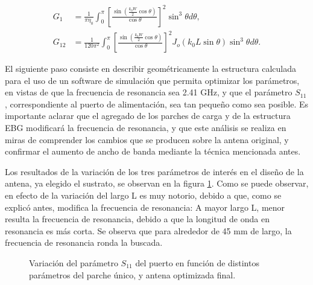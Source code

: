 \begin{align}
	\label{eq:conductancia-microstrip-balanis}
	G_1 &= \frac{1}{\pi \eta_0} \int_0^\pi \left[ \frac{\sin \left( \frac{k_0 W}{2} \cos \theta \right) }{\cos \theta}\right]^2 \sin^3 \theta d\theta, \\
	G_{12} &= \frac{1}{120 \pi^2} \int_0^{\pi} \left[ \frac{\sin \left( \frac{k_0 W}{2} \cos \theta \right) }{\cos \theta}\right]^2 J_o(k_0 L \sin \theta) \sin^3 \theta d\theta.
\end{align}

El siguiente paso consiste en describir geométricamente la estructura calculada para el uso de un software de simulación que permita optimizar los parámetros, en vistas de que la frecuencia de resonancia sea 2.41 GHz, y que el parámetro $S_{11}$, correspondiente al puerto de alimentación, sea tan pequeño como sea posible. Es importante aclarar que el agregado de los parches de carga y de la estructura EBG modificará la frecuencia de resonancia, y que este análisis se realiza en miras de comprender los cambios que se producen sobre la antena original, y confirmar el aumento de ancho de banda mediante la técnica mencionada antes.

Los resultados de la variación de los tres parámetros de interés en el diseño de la antena, ya elegido el sustrato, se observan en la figura \ref{fig:simulaciones-microstrip-1parche}. Como se puede observar, en efecto de la variación del largo L es muy notorio, debido a que, como se explicó antes, modifica la frecuencia de resonancia: A mayor largo L, menor resulta la frecuencia de resonancia, debido a que la longitud de onda en resonancia es más corta. Se observa que para alrededor de 45 mm de largo, la frecuencia de resonancia ronda la buscada.

\begin{figure}[H]
	\centering 
	\hspace{19pt}
	\caption{Variación del parámetro $S_{11}$ del puerto en función de distintos parámetros del parche único, y antena optimizada final.}
	\label{fig:simulaciones-microstrip-1parche}
\end{figure}

